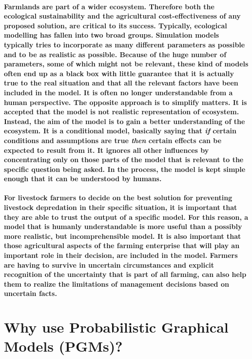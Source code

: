 \paragraph{Farmlands are part of a wider ecosystem. Therefore both the ecological
sustainability and the agricultural cost-effectiveness of any proposed
solution, are critical to its success. Typically, ecological modelling
has fallen into two broad groups. Simulation models typically tries
to incorporate as many different parameters as possible and to be
as realistic as possible. Because of the huge number of parameters,
some of which might not be relevant, these kind of models often end
up as a \textquotedbl{}black box\textquotedbl{} with little guarantee
that it is actually true to the real situation and that all the relevant
factors have been included in the model. It is often no longer understandable
from a human perspective. The opposite approach is to simplify matters.
It is accepted that the model is not realistic representation of ecosystem.
Instead, the aim of the model is to gain a better understanding of
the ecosystem. It is a conditional model, basically saying that \textit{if
}certain conditions and assumptions are true \textit{then }certain
effects can be expected to result from it. It ignores all other influences
by concentrating only on those parts of the model that is relevant
to the specific question being asked. In the process, the model is
kept simple enough that it can be understood by humans.}

\paragraph{For livestock farmers to decide on the best solution for preventing
livestock depredation in their specific situation, it is important
that they are able to trust the output of a specific model. For this
reason, a model that is humanly understandable is more useful than
a possibly more realistic, but incomprehensible model. It is also
important that those agricultural aspects of the farming enterprise
that will play an important role in their decision, are included in
the model. Farmers are having to survive in uncertain circumstances
and explicit recognition of the uncertainty that is part of all farming,
can also help them to realize the limitations of management decisions
based on uncertain facts.}

\section{Why use Probabilistic Graphical Models (PGMs)?}

